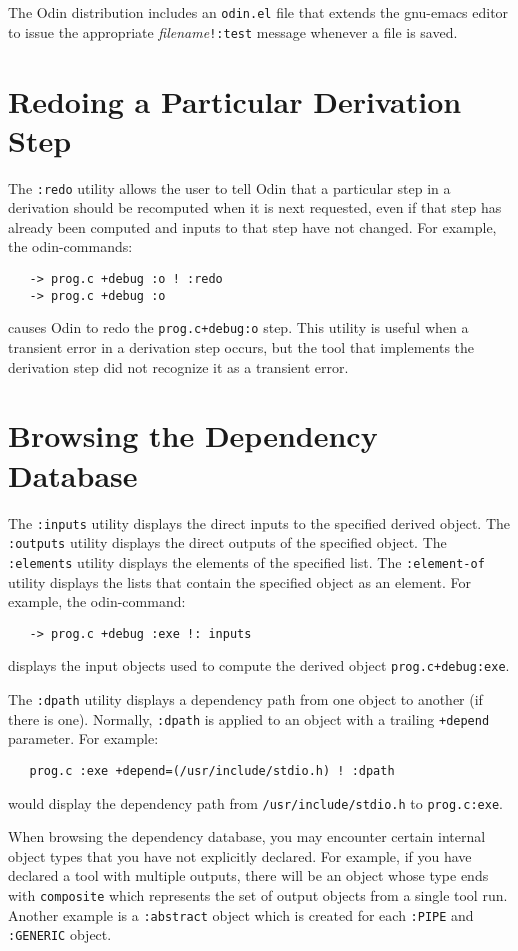 \documentclass[hidelinks]{report}
\newcommand{\ex}{\tt}   %
\begin{document}
The Odin distribution includes an {\ex odin.el} file
that extends the gnu-emacs editor to issue the appropriate
{\em filename}{\ex!:test} message whenever a file is saved.

\section{Redoing a Particular Derivation Step}

The {\ex :redo} utility allows the user to tell Odin that
a particular step in a derivation should be recomputed
when it is next requested,
even if that step has already been computed and
inputs to that step have not changed.
For example, the odin-commands:
\begin{verbatim}
   -> prog.c +debug :o ! :redo
   -> prog.c +debug :o
\end{verbatim}
causes Odin to redo the {\ex prog.c+debug:o} step.
This utility is useful when a transient error in a derivation step occurs,
but the tool that implements the derivation step did not recognize it as
a transient error.

\section{Browsing the Dependency Database}

The {\ex :inputs} utility displays the direct inputs to the
specified derived object.
The {\ex :outputs} utility displays the direct outputs of the
specified object.
The {\ex :elements} utility displays the elements of the
specified list.
The {\ex :element-of} utility displays the lists that contain
the specified object as an element.
For example, the odin-command:
\begin{verbatim}
   -> prog.c +debug :exe !: inputs
\end{verbatim}
displays the input objects used to compute the derived object
{\ex prog.c+debug:exe}.

The {\ex :dpath} utility displays a dependency path from one object
to another (if there is one).
Normally, {\ex :dpath} is applied to an object with a trailing
{\ex +depend} parameter.  For example:
\begin{verbatim}
   prog.c :exe +depend=(/usr/include/stdio.h) ! :dpath
\end{verbatim}
would display the dependency path from {\ex /usr/include/stdio.h} to
{\ex prog.c:exe}.

When browsing the dependency database, you may encounter certain internal
object types that you have not explicitly declared.  For example, if you have
declared a tool with multiple outputs, there will be an object whose
type ends with {\ex *composite} which represents the set of output
objects from a single tool run.  Another example is a {\ex :abstract}
object which is created for each {\ex :PIPE} and {\ex :GENERIC} object.
\end{document}
